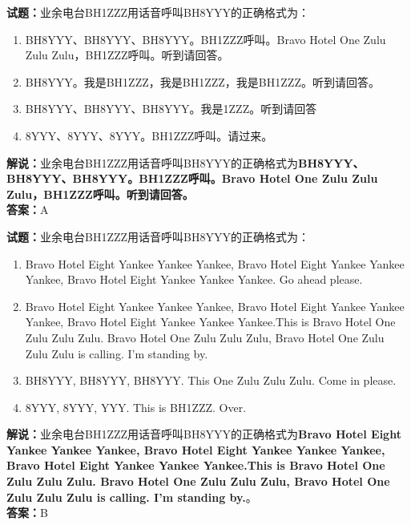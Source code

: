 \documentclass{ctexbook}
\begin{document}
\noindent\textbf{试题：}业余电台BH1ZZZ用话音呼叫BH8YYY的正确格式为：
\begin{enumerate}[leftmargin=3em]
\item BH8YYY、BH8YYY、BH8YYY。BH1ZZZ呼叫。Bravo Hotel One Zulu Zulu Zulu，BH1ZZZ呼叫。听到请回答。
\item BH8YYY。我是BH1ZZZ，我是BH1ZZZ，我是BH1ZZZ。听到请回答。
\item BH8YYY、BH8YYY、BH8YYY。我是1ZZZ。听到请回答
\item 8YYY、8YYY、8YYY。BH1ZZZ呼叫。请过来。
\end{enumerate}
\noindent\textbf{解说：}业余电台BH1ZZZ用话音呼叫BH8YYY的正确格式为\textbf{BH8YYY、BH8YYY、BH8YYY。BH1ZZZ呼叫。Bravo Hotel One Zulu Zulu Zulu，BH1ZZZ呼叫。听到请回答。}\\\noindent\textbf{答案：}A

\bigskip




\noindent\textbf{试题：}业余电台BH1ZZZ用话音呼叫BH8YYY的正确格式为：
\begin{enumerate}[leftmargin=3em]
\item Bravo Hotel Eight Yankee Yankee Yankee, Bravo Hotel Eight Yankee Yankee Yankee, Bravo Hotel Eight Yankee Yankee Yankee. Go ahead please.
\item Bravo Hotel Eight Yankee Yankee Yankee, Bravo Hotel Eight Yankee Yankee Yankee, Bravo Hotel Eight Yankee Yankee Yankee.This is Bravo Hotel One Zulu Zulu Zulu. Bravo Hotel One Zulu Zulu Zulu, Bravo Hotel One Zulu Zulu Zulu is calling. I’m standing by.
\item BH8YYY, BH8YYY, BH8YYY. This One Zulu Zulu Zulu. Come in please.
\item 8YYY, 8YYY, YYY. This is BH1ZZZ. Over.
\end{enumerate}
\noindent\textbf{解说：}业余电台BH1ZZZ用话音呼叫BH8YYY的正确格式为\textbf{Bravo Hotel Eight Yankee Yankee Yankee, Bravo Hotel Eight Yankee Yankee Yankee, Bravo Hotel Eight Yankee Yankee Yankee.This is Bravo Hotel One Zulu Zulu Zulu. Bravo Hotel One Zulu Zulu Zulu, Bravo Hotel One Zulu Zulu Zulu is calling. I’m standing by.}。\\\noindent\textbf{答案：}B

\bigskip
\end{document}
